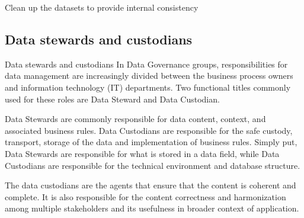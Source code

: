  Clean up the datasets to provide internal consistency 
 
 \subsection{Data stewards and custodians}
 Data stewards and custodians
 In Data Governance groups, responsibilities for data management are increasingly divided between the business process owners and information technology (IT) departments. Two functional titles commonly used for these roles are Data Steward and Data Custodian.
 
 Data Stewards are commonly responsible for data content, context, and associated business rules. Data Custodians are responsible for the safe custody, transport, storage of the data and implementation of business rules. Simply put, Data Stewards are responsible for what is stored in a data field, while Data Custodians are responsible for the technical environment and database structure.
 
 The data custodians are the agents that ensure that the content is coherent and complete. It is also responsible for the content correctness and harmonization among multiple stakeholders and its usefulness in broader context of application.
 
